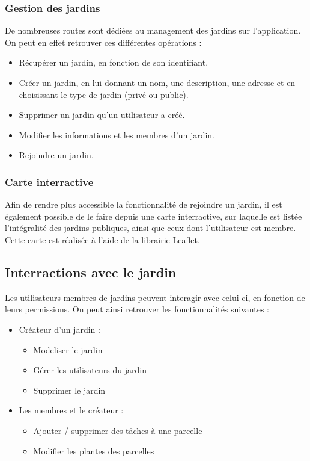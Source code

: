 \documentclass[french,a4paper]{article}
\begin{document}
\subsubsection{Gestion des jardins}
De nombreuses routes sont dédiées au management des jardins sur l'application. On peut en effet retrouver ces différentes opérations :
\begin{itemize}
    \item Récupérer un jardin, en fonction de son identifiant.
    \item Créer un jardin, en lui donnant un nom, une description, une adresse et en choisissant le type de jardin (privé ou public).
    \item Supprimer un jardin qu'un utilisateur a créé.
    \item Modifier les informations et les membres d'un jardin.
    \item Rejoindre un jardin.
\end{itemize} 

\subsubsection{Carte interractive}
Afin de rendre plus accessible la fonctionnalité de rejoindre un jardin, il est également possible de le faire depuis une carte interractive, sur laquelle est listée l'intégralité des jardins publiques, ainsi que ceux dont l'utilisateur est membre. Cette carte est réalisée à l'aide de la librairie Leaflet.

\subsection{Interractions avec le jardin}
Les utilisateurs membres de jardins peuvent interagir avec celui-ci, en fonction de leurs permissions. On peut ainsi retrouver les fonctionnalités suivantes :
\begin{itemize}
    \item Créateur d'un jardin : 
    \begin{itemize}
        \item Modeliser le jardin
        \item Gérer les utilisateurs du jardin
        \item Supprimer le jardin
    \end{itemize}
    \item Les membres et le créateur :
    \begin{itemize}
        \item Ajouter / supprimer des tâches à une parcelle
        \item Modifier les plantes des parcelles
    \end{itemize}
\end{itemize}
\end{document}
